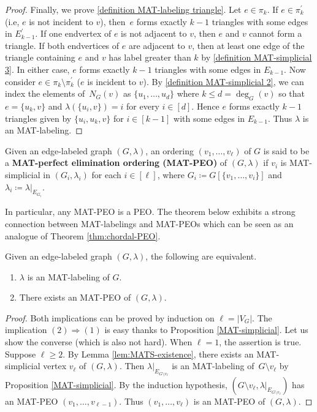 \documentclass[ALCO, Unicode,published]{cedram}
\begin{document}
\begin{proof}
Finally, we prove \ref{definition MAT-labeling triangle}. 
Let $ e \in \pi_{k} $.
If $ e \in \pi_{k}^{\prime} $ (i.e, $ e $ is not incident to $ v $), then~$ e $ forms exactly $ k-1 $ triangles with some edges in $ E_{k-1}^{\prime} $. 
If one endvertex of $ e $ is not adjacent to $ v $, then $ e $ and $v$ cannot form a triangle. 
If both endvertices of $ e $ are adjacent to $ v $, then at least one edge of the triangle containing $ e $ and $ v $ has label greater than $ k $ by \ref{definition MAT-simplicial 3}. 
In either case, $ e $ forms exactly $ k-1 $ triangles with some edges in $ E_{k-1} $. 
Now consider  $ e \in \pi_{k} \setminus \pi_{k}^{\prime} $ (\ie  $ e $ is incident to $ v $). 
By  \ref{definition MAT-simplicial 2}, we can index the elements of~$ N_{G}(v)$  as $\{u_{1}, \dots, u_{d}\} $  where $k\le d=\deg_G(v)$ so that $ e = \{u_{k}, v\} $ and $ \lambda(\{u_{i}, v\}) = i $ for every $ i \in [d] $. 
Hence $ e $ forms exactly $ k-1 $ triangles given by $ \{u_{i}, u_{k}, v\} $ for $ i \in [k-1] $ with some edges in $ E_{k-1} $.  
Thus $ \lambda $ is an MAT-labeling.  
\end{proof}

\begin{definition}
Given an edge-labeled graph $ (G,\lambda) $, an ordering $ (v_{1}, \dots, v_{\ell}) $ of $ G $ is said to be a \textbf{MAT-perfect elimination ordering (MAT-PEO)} of $ (G,\lambda) $ if $ v_{i} $ is MAT-simplicial in $ (G_{i}, \lambda_{i}) $ for each $ i \in [\ell] $, where $ G_{i} \coloneqq G[\{v_{1}, \dots, v_{i}\}] $ and $ \lambda_{i} \coloneqq \lambda|_{E_{G_{i}}} $. 
\end{definition}

In particular, any MAT-PEO is a PEO.
The theorem below exhibits a strong connection between MAT-labelings and MAT-PEOs which can be seen as an analogue of Theorem \ref{thm:chordal-PEO}.
\begin{theorem}
\label{MAT-labeling ordering}
Given an edge-labeled graph $ (G, \lambda) $, the following are equivalent. 
\begin{enumerate}[(1)]
\item $ \lambda $ is an MAT-labeling of $ G $. 
\item There exists an MAT-PEO of $ (G, \lambda) $. 
\end{enumerate}
\end{theorem}
\begin{proof}
Both implications can be proved by induction on $ \ell = |V_{G}| $.
The implication $ (2) \Rightarrow (1) $ is easy thanks to Proposition \ref{MAT-simplicial}. 
Let us show the converse (which is also not hard). 
When $ \ell = 1 $, the assertion is true.
Suppose $ \ell \geq 2 $. 
By Lemma \ref{lem:MATS-existence}, there exists an MAT-simplicial vertex $ v_{\ell} $ of $ (G, \lambda) $. 
Then $ \lambda|_{E_{G\setminus v_{\ell}}} $ is an MAT-labeling of~$ G\setminus v_{\ell} $ by Proposition \ref{MAT-simplicial}. 
By the induction hypothesis, $ (G\setminus v_{\ell}, \lambda|_{E_{G\setminus v_{\ell}}}) $ has an MAT-PEO $ (v_{1}, \dots, v_{\ell -1}) $. 
Thus $ (v_{1}, \dots, v_{\ell}) $ is an MAT-PEO of $ (G,\lambda) $. 
\end{proof}
\end{document}
